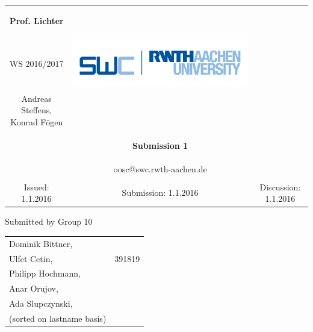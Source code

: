 \documentclass[a4paper,12pt,oneside]{scrreprt}
\begin{document}
	
\begin{tabular}{ccc}
	\begin{large} \textbf{Prof. Lichter} \end{large} &
	
	\begin{minipage}[H]{3.5cm}
	\centering
		\begin{large} OOSC \end{large} \\
		\begin{large} WS 2016/2017 \end{large}
	\end{minipage} &
	
	\begin{minipage}[H]{4cm}
		\includegraphics[keepaspectratio,width=\textwidth,angle=0]{images/swc.png}
	\end{minipage} \\
Andreas Steffens, Konrad F\"ogen &  &  \\
& \begin{huge} \textbf{Submission 1} \end{huge}&  \\
& oosc@swc.rwth-aachen.de &  \\
& & \\
Issued: 1.1.2016 &
Submission: 1.1.2016 &
Discussion: 1.1.2016 \\
\end{tabular}
\newline \newline \newline
\centering
Submitted by Group 10

\begin{tabular}{ll}
	Dominik Bittner, & \\
	Ulfet Cetin, & 391819\\
 	Philipp Hochmann,\\
 	Anar Orujov,\\
 	Ada Slupczynski, \\
 	(sorted on lastname basis)
\end{tabular}
\end{document}
